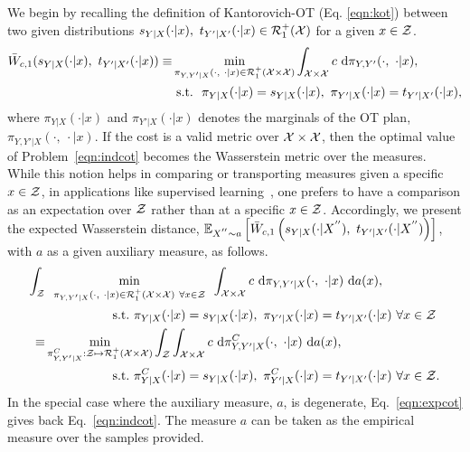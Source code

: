 We begin by recalling the definition of Kantorovich-OT (Eq. \ref{eqn:kot}) between two given distributions $s_{Y|X}(\cdot|x),\ t_{Y'|X'}(\cdot|x)\in \mathcal{R}_1^+(\mathcal{X})$ for a given $x\in \mathcal{Z}$.
\begin{align}\label{eqn:indcot}
\bar{W}_{c,1}(s_{Y|X}(\cdot|x), \ t_{Y'|X'}(\cdot|x)) \equiv &\min_{\pi_{Y, Y'|X}(\cdot,\ \cdot|x)\in\mathcal{R}_1^+(\calX\times\calX)}\int_{\calX\times\calX} c\ \textup{d}\pi_{Y, Y'}(\cdot,\ \cdot|x), \\
&\textup{ s.t.}\ \ \pi_{Y|X}(\cdot|x)=s_{Y|X}(\cdot|x), \ \pi_{Y'|X}(\cdot|x)=t_{Y'|X'}(\cdot|x),\nonumber
\end{align}
where $\pi_{Y|X}(\cdot|x)$ and $\pi_{Y'|X}(\cdot|x)$ denotes the marginals of the OT plan, $\pi_{Y, Y'|X}(\cdot,\ \cdot|x)$.
If the cost is a valid metric over $\mathcal{X} \times \mathcal{X}$, then the optimal value of Problem~\ref{eqn:indcot} becomes the Wasserstein metric over the measures. While this notion helps in comparing or transporting measures given a specific $x\in\mathcal{Z}$, in applications like supervised learning~\citep{Frogner15}, one prefers to have a comparison as an expectation over $\mathcal{Z}$ rather than at a specific $x\in\mathcal{Z}$. Accordingly, we present the expected Wasserstein distance, $\mathbb{E}_{X^{''}\sim a}\left[\bar{W}_{c,1}\left(s_{Y|X}(\cdot|X^{''}), ~t_{Y'|X'}(\cdot|X^{''})\right)\right]$, with $a$ as a given auxiliary measure, as follows.
\begin{align}\label{eqn:expcot}
 \int_{\calZ}&\min_{\begin{array}{c}\scriptstyle
     \pi_{Y, Y'|X}(\cdot, \ \cdot|x)\in\mathcal{R}_1^+(\calX\times\calX)\ \forall x\in \calZ
\end{array}}\int_{\calX\times\calX} c\ \textup{d}\pi_{Y,  Y'|X}(\cdot, \ \cdot|x) \ \textup{d}a(x), \nonumber\\
&\qquad\quad\qquad\textup{ s.t.}~ \pi_{Y|X}(\cdot|x)=s_{Y|X}(\cdot|x), \ 
\pi_{Y'|X}(\cdot|x)=t_{Y'|X'}(\cdot|x)\ \forall x\in \calZ\nonumber \\
\equiv &\min_{\pi^C_{Y, Y'|X}:\calZ\mapsto\mathcal{R}_1^+(\calX\times\calX)}\int_{\calZ}\int_{\calX\times\calX} c\ \textup{d}\pi^C_{Y, Y'|X}(\cdot, \ \cdot|x)\ \textup{d}a(x), \nonumber\\
&\qquad\quad\qquad\textup{ s.t.}~ \pi^C_{Y|X}(\cdot|x)=s_{Y|X}(\cdot|x),\ \pi^C_{Y'|X}(\cdot|x)=t_{Y'|X'}(\cdot|x)\ \forall x\in \calZ.
\end{align}
In the special case where the auxiliary measure, $a$, is degenerate, Eq.~\ref{eqn:expcot} gives back Eq.~\ref{eqn:indcot}.
The measure $a$ can be taken as the empirical measure over the samples provided.


